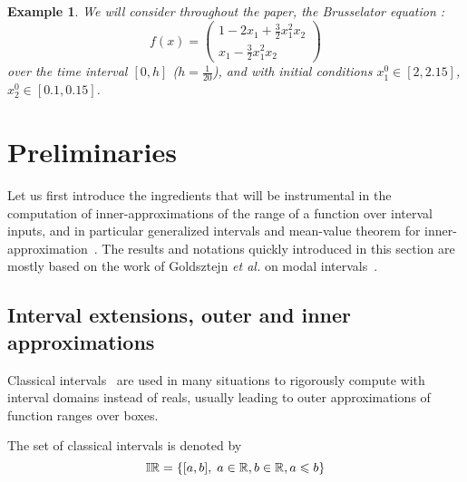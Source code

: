 \documentclass{sig-alternate-05-2015} %
\newcommand\ForAuthors[1]%
 {\par\smallskip                     %
  \begin{center}%
   \fbox%
   {\parbox{0.9\linewidth}%
    {\raggedright\sc--- #1}%
   }%
  \end{center}%
  \par\smallskip                     %
 }
\newtheorem{example}{Example}
\def\bbr{{\Bbb R}}
\def\I{{\Bbb I \Bbb R}}
\newcommand{\addTODO}[1]{\addcontentsline{tdo}{toc}{#1}}
\newcommand{\TODO}[1]{{\bf{\scriptsize #1}\addTODO{#1}}}
\newcommand{\SP}[1]{\TODO{Sylvie : #1}}
\begin{document}


\begin{example}
\label{running0}
We will consider throughout the paper, the Brusselator equation \cite{RamdaniMCS14} : 
$$ f(x) = \left(\begin{array}{l}
1-2 x_1+\frac{3}{2} x_1^2 x_2 \\
x_1-\frac{3}{2} x_1^2x_2
\end{array}\right)$$
over the time interval $\left[0,h\right]$ ($h=\frac{1}{20}$), and with initial conditions
$x_1^0 \in [2, 2.15]$, $x^0_2 \in [0.1, 0.15]$.
\end{example}

\section{Preliminaries}
\label{prelim}

Let us first introduce the ingredients that will be instrumental in the computation of inner-approximations of
the range of a function over interval inputs, and in particular
generalized intervals and mean-value theorem for inner-approximation~\label{generalized}. 
The results and notations quickly introduced in this section are mostly based on the work of Goldsztejn {\it et al.} 
on modal intervals~\cite{gold1}. 

\subsection{Interval extensions, outer and inner approximations}
Classical intervals~\cite{Moore66,IA2001} are used in many situations to rigorously compute with interval
domains instead of reals, usually leading to outer approximations of function
ranges over boxes. 

The set of classical intervals is 
denoted by $$\I = \{ [a,b], \; a\in \bbr, b \in \bbr, a \leqslant b\}$$ 
\end{document}
